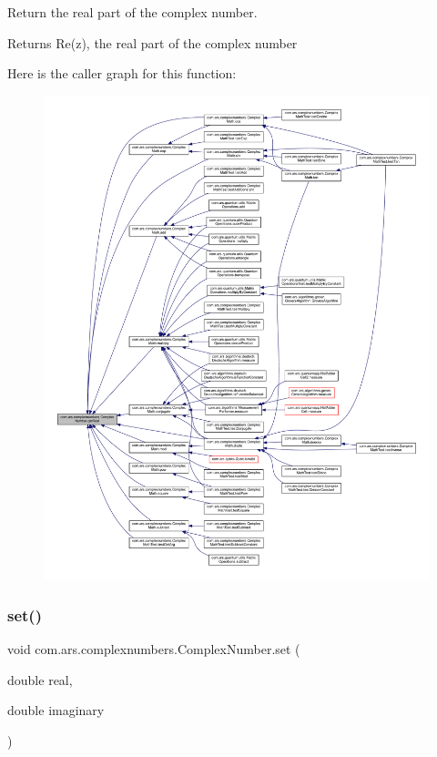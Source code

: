 Return the real part of the complex number. \begin{DoxyReturn}{Returns}
Re(z), the real part of the complex number 
\end{DoxyReturn}
Here is the caller graph for this function\+:
\nopagebreak
\begin{figure}[H]
\begin{center}
\leavevmode
\includegraphics[width=350pt]{classcom_1_1ars_1_1complexnumbers_1_1_complex_number_a4cb4de35836a0ca818d3f2ce2df07736_icgraph}
\end{center}
\end{figure}
\hypertarget{classcom_1_1ars_1_1complexnumbers_1_1_complex_number_ac93a6120b2d6576dac75c256f0cd667f}{}\label{classcom_1_1ars_1_1complexnumbers_1_1_complex_number_ac93a6120b2d6576dac75c256f0cd667f} 
\subsubsection{\texorpdfstring{set()}{set()}}
{\footnotesize\ttfamily void com.\+ars.\+complexnumbers.\+Complex\+Number.\+set (\begin{DoxyParamCaption}\item[{double}]{real,  }\item[{double}]{imaginary }\end{DoxyParamCaption})}

